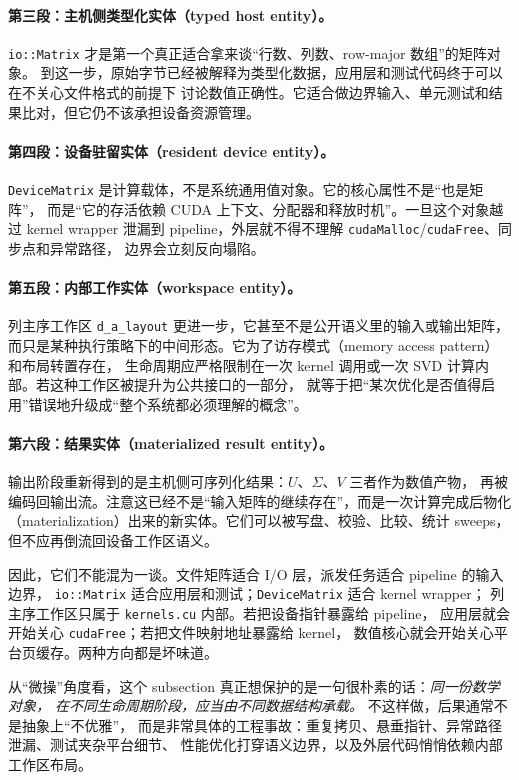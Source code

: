\paragraph{第三段：主机侧类型化实体（typed host entity）。}
\texttt{io::Matrix} 才是第一个真正适合拿来谈“行数、列数、row-major 数组”的矩阵对象。
到这一步，原始字节已经被解释为类型化数据，应用层和测试代码终于可以在不关心文件格式的前提下
讨论数值正确性。它适合做边界输入、单元测试和结果比对，但它仍不该承担设备资源管理。

\paragraph{第四段：设备驻留实体（resident device entity）。}
\texttt{DeviceMatrix} 是计算载体，不是系统通用值对象。它的核心属性不是“也是矩阵”，
而是“它的存活依赖 CUDA 上下文、分配器和释放时机”。一旦这个对象越过 kernel wrapper
泄漏到 pipeline，外层就不得不理解 \texttt{cudaMalloc}/\texttt{cudaFree}、同步点和异常路径，
边界会立刻反向塌陷。

\paragraph{第五段：内部工作实体（workspace entity）。}
列主序工作区 \texttt{d\_a\_layout} 更进一步，它甚至不是公开语义里的输入或输出矩阵，
而只是某种执行策略下的中间形态。它为了访存模式（memory access pattern）和布局转置存在，
生命周期应严格限制在一次 kernel 调用或一次 SVD 计算内部。若这种工作区被提升为公共接口的一部分，
就等于把“某次优化是否值得启用”错误地升级成“整个系统都必须理解的概念”。

\paragraph{第六段：结果实体（materialized result entity）。}
输出阶段重新得到的是主机侧可序列化结果：\(U\)、\(\Sigma\)、\(V\) 三者作为数值产物，
再被编码回输出流。注意这已经不是“输入矩阵的继续存在”，而是一次计算完成后物化
（materialization）出来的新实体。它们可以被写盘、校验、比较、统计 sweeps，
但不应再倒流回设备工作区语义。

因此，它们不能混为一谈。文件矩阵适合 I/O 层，派发任务适合 pipeline 的输入边界，
\texttt{io::Matrix} 适合应用层和测试；\texttt{DeviceMatrix} 适合 kernel wrapper；
列主序工作区只属于 \texttt{kernels.cu} 内部。若把设备指针暴露给 pipeline，
应用层就会开始关心 \texttt{cudaFree}；若把文件映射地址暴露给 kernel，
数值核心就会开始关心平台页缓存。两种方向都是坏味道。

从“微操”角度看，这个 subsection 真正想保护的是一句很朴素的话：\emph{同一份数学对象，
    在不同生命周期阶段，应当由不同数据结构承载。} 不这样做，后果通常不是抽象上“不优雅”，
而是非常具体的工程事故：重复拷贝、悬垂指针、异常路径泄漏、测试夹杂平台细节、
性能优化打穿语义边界，以及外层代码悄悄依赖内部工作区布局。

